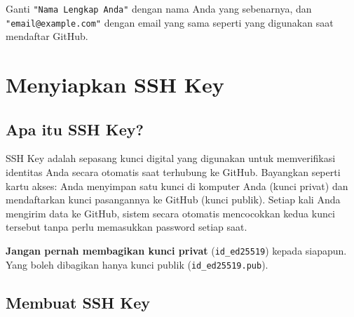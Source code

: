 \documentclass[
    a4paper,
    11pt,
    parskip=half
]{scrartcl}
\begin{document}
\begin{notebox}
Ganti \texttt{"Nama Lengkap Anda"} dengan nama Anda yang sebenarnya, dan \texttt{"email@example.com"} dengan email yang sama seperti yang digunakan saat mendaftar GitHub.
\end{notebox}

\section{Menyiapkan SSH Key}
\label{sec:ssh-key}

\subsection{Apa itu SSH Key?}

SSH Key adalah sepasang kunci digital yang digunakan untuk memverifikasi identitas Anda secara otomatis saat terhubung ke GitHub. Bayangkan seperti kartu akses: Anda menyimpan satu kunci di komputer Anda (kunci privat) dan mendaftarkan kunci pasangannya ke GitHub (kunci publik). Setiap kali Anda mengirim data ke GitHub, sistem secara otomatis mencocokkan kedua kunci tersebut tanpa perlu memasukkan password setiap saat.

\begin{warningbox}
\textbf{Jangan pernah membagikan kunci privat} (\texttt{id\_ed25519}) kepada siapapun. Yang boleh dibagikan hanya kunci publik (\texttt{id\_ed25519.pub}).
\end{warningbox}

\subsection{Membuat SSH Key}
\label{sec:generate-key}
\end{document}
